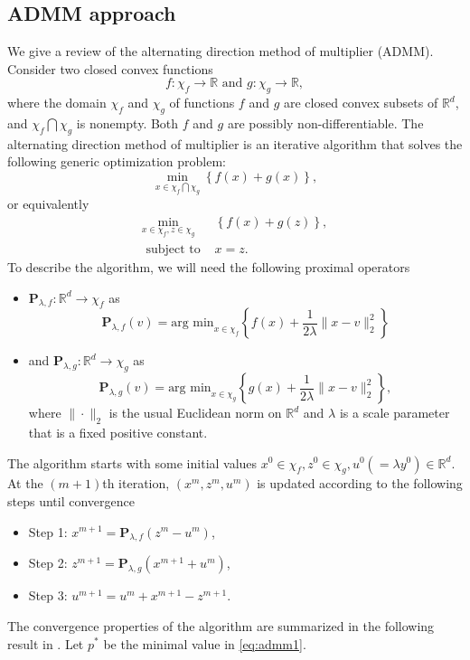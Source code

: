 \documentclass[AMS,STIX1COL]{WileyNJD-v2}
\begin{document}
\subsection{ADMM approach}
\label{sec:ADMM}
We give a review of the alternating direction method
of multiplier (ADMM).
Consider two closed convex functions
$$
f : \chi_f \to \mathbb{R} \mbox{ and } g : \chi_g \to \mathbb{R},
$$
where the domain $\chi_f$ and $\chi_g$ of functions $f$ and $g$ are closed convex subsets of $\mathbb{R}^d$, and $\chi_f \bigcap \chi_g$ is nonempty.
Both $f$ and $g$ are possibly non-differentiable.
The alternating direction method
of multiplier is an iterative algorithm that solves the following generic optimization problem:
$$
\min_{x \in \chi_f \bigcap \chi_g} \left\{f(x) + g(x) \right\},
$$
or equivalently
\begin{eqnarray}
\label{eq:admm1}
\min_{x \in \chi_f, z\in \chi_g} & \left\{f(x) + g(z) \right\}, \\
\mbox{ subject to } & x = z. \nonumber
\end{eqnarray}
To describe the algorithm, we will need the following proximal operators
\begin{itemize}
\item $\mathbf{P}_{\lambda,f}: \mathbb{R}^d \to \chi_f$ as
$$
\mathbf{P}_{\lambda,f}(v) = \mbox{arg min}_{x \in \chi_f} \left\{
f(x) + \frac{1}{2\lambda} \|x-v\|^2_2
\right\}
$$

\item and $\mathbf{P}_{\lambda,g}: \mathbb{R}^d \to \chi_g$ as
$$
\mathbf{P}_{\lambda,g}(v) = \mbox{arg min}_{x \in \chi_g} \left\{
g(x) + \frac{1}{2\lambda} \|x-v\|^2_2
\right\},
$$
where $\|\cdot\|_2$ is the usual Euclidean norm on $\mathbb{R}^d$ and $\lambda$ is a scale parameter that is a fixed positive constant.
\end{itemize}
The algorithm starts with some initial values $x^0 \in \chi_f,
z^0 \in \chi_g, u^0 (=\lambda y^0) \in \mathbb{R}^d$.
At the $(m+1)$th iteration, $(x^m, z^m, u^m)$ is updated according to the following steps until convergence
\begin{itemize}
\item Step 1: $x^{m+1} = \mathbf{P}_{\lambda,f}(z^m - u^m)$,

\item Step 2: $z^{m+1} = \mathbf{P}_{\lambda,g}(x^{m+1} + u^m)$,

\item Step 3: $u^{m+1} = u^m + x^{m+1} - z^{m+1}$.

\end{itemize}
The convergence properties of the algorithm are summarized in the following result in \cite{boyd2011distributed}.
Let $p^\ast$ be the minimal value in \eqref{eq:admm1}.
\end{document}
